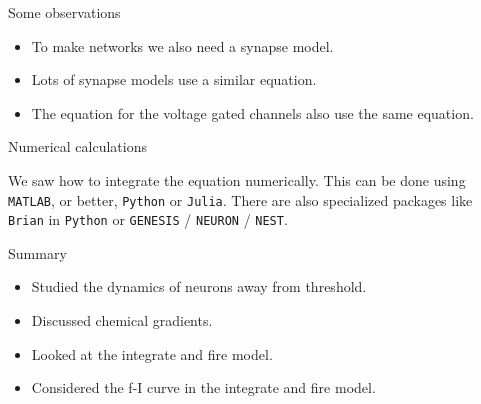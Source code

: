 \documentclass{beamer}
\begin{document}
\begin{frame}{Some observations}
  \begin{itemize}
  \item To make networks we also need a synapse model.
  \item Lots of synapse models use a similar equation.
  \item The equation for the voltage gated channels also use the same equation.
  \end{itemize}
\end{frame}


\begin{frame}{Numerical calculations}

We saw how to integrate the equation numerically. This can be done
using \texttt{MATLAB}, or better, \texttt{Python} or \texttt{Julia}. There are also specialized
packages like \texttt{Brian} in \texttt{Python} or \texttt{GENESIS} / \texttt{NEURON} / \texttt{NEST}.
  
\end{frame}

\begin{frame}{Summary}
  \begin{itemize}
  \item Studied the dynamics of neurons away from threshold.
  \item Discussed chemical gradients.
  \item Looked at the integrate and fire model.
  \item Considered the f-I curve in the integrate and fire model.
  \end{itemize}
\end{frame}
\end{document}
